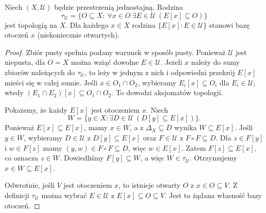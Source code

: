 \begin{twierdzenie}
\label{thm:topog-jednostajne-topologia}
Niech $(X,\mathcal U)$ będzie przestrzenią jednostajną.
Rodzina
\[
 \tau_{\mathcal U}=
 \{O\subseteq X:\ \forall x\in O\ \exists E\in\mathcal U
                   \ (E[x]\subseteq O)\}
\]
jest topologią na $X$. Dla każdego $x\in X$
rodzina $\{E[x]:E\in\mathcal U\}$ stanowi bazę
otoczeń $x$ (niekoniecznie otwartych).
\end{twierdzenie}
\begin{proof}
Zbiór pusty spełnia podany warunek w sposób pusty.
Ponieważ $\mathcal U$ jest niepusta, dla $O=X$
można wziąć dowolne $E\in\mathcal U$.
Jeżeli $x$ należy do sumy zbiorów należących do
$\tau_{\mathcal U}$, to leży w jednym z nich i
odpowiedni przekrój $E[x]$ mieści się w całej sumie.
Jeśli $x\in O_1\cap O_2$, wybieramy
$E_i[x]\subseteq O_i$ dla $E_i\in\mathcal U$;
wtedy $(E_1\cap E_2)[x]\subseteq O_1\cap O_2$.
To dowodzi aksjomatów topologii.

Pokażemy, że każdy $E[x]$ jest otoczeniem $x$.
Niech
\[
 W=\{y\in X:\exists D\in\mathcal U\
                         (D[y]\subseteq E[x])\}.
\]
Ponieważ $E[x]\subseteq E[x]$, mamy $x\in W$,
a z $\Delta_X\subseteq D$ wynika $W\subseteq E[x]$.
Jeśli $y\in W$, wybieramy $D\in\mathcal U$
z $D[y]\subseteq E[x]$ oraz $F\in\mathcal U$
z $F\circ F\subseteq D$. Dla $z\in F[y]$ i
$w\in F[z]$ mamy $(y,w)\in F\circ F\subseteq D$,
więc $w\in E[x]$. Zatem $F[z]\subseteq E[x]$,
co oznacza $z\in W$. Dowiedliśmy $F[y]\subseteq W$,
a więc $W\in\tau_{\mathcal U}$.
Otrzymujemy $x\in W\subseteq E[x]$.

Odwrotnie, jeśli $V$ jest otoczeniem $x$,
to istnieje otwarty $O$ z $x\in O\subseteq V$.
Z definicji $\tau_{\mathcal U}$ można wybrać
$E\in\mathcal U$ z $E[x]\subseteq O\subseteq V$.
Jest to żądana własność bazy otoczeń.
\end{proof}

